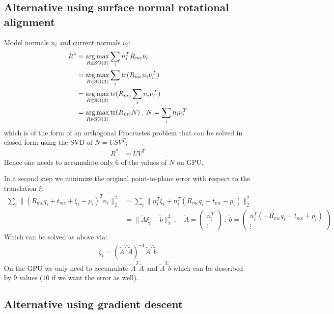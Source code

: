\subsection{Alternative using surface normal rotational alignment} 

Model normals $n_i$ and current normals $\nu_i$:
\begin{align}
  R^* &= \operatorname*{arg\,max}_{R\in\mathrm{SO(3)}} \sum_i n_i^T R_{mc} \nu_i \\
  &= \operatorname*{arg\,max}_{R\in\mathrm{SO(3)}}\sum_i \operatorname*{tr} (R_{mc} n_i \nu_i^T )\\
  &= \operatorname*{arg\,max}_{R\in\mathrm{SO(3)}}\operatorname*{tr} (R_{mc} \sum_i n_i \nu_i^T )\\
  &= \operatorname*{arg\,max}_{R\in\mathrm{SO(3)}}\operatorname*{tr} (R_{mc} N) \,,\; N = \sum_i n_i \nu_i^T 
\end{align}
which is of the form of an orthogonal Procrustes problem that can be
solved in closed form using the SVD of $N=USV^T$:
\begin{align}
  R^* &= UV^T
\end{align}
Hence one needs to accumulate only $6$ of the values of $N$ on GPU.

In a second step we minimize the original point-to-plane error with respect to the translation $\xi$:
\begin{align}
  \sum_i \| ( R_{mc} q_i + t_{mc} + \xi_t - p_i )^T n_i \|^2_2 
  &= \sum_i \| n_i^T \xi_t + n_i^T ( R_{mc} q_i + t_{mc} - p_i ) \|^2_2 \\
  &= \|\tilde{A} \xi_t -\tilde{b} \|^2_2 \,,\quad
  \tilde{A} = \begin{pmatrix}
     n_i^T \\
    \vdots
  \end{pmatrix}\,,\;
  \tilde{b} = \begin{pmatrix}
    n_i^T ( - R_{mc} q_i - t_{mc} + p_i) \\
    \vdots
  \end{pmatrix}
\end{align}
Which can be solved as above via:
\begin{align}
  \xi_t = (\tilde{A}^T \tilde{A})^{-1} \tilde{A}^T \tilde{b}
\end{align}
On the GPU we only need to accumulate $\tilde{A}^T \tilde{A}$ and
$\tilde{A}^T \tilde{b}$ which can be described by $9$ values ($10$ if
we want the error as well).

\subsection{Alternative using gradient descent}

